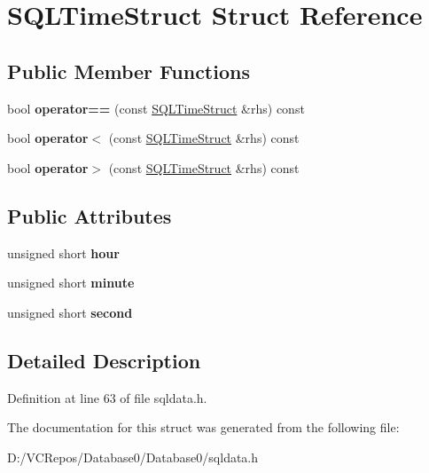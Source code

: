 \hypertarget{struct_s_q_l_time_struct}{}\section{S\+Q\+L\+Time\+Struct Struct Reference}
\label{struct_s_q_l_time_struct}
\subsection*{Public Member Functions}
\begin{DoxyCompactItemize}
\item 
\mbox{\label{struct_s_q_l_time_struct_a12aabdc212ea4f5573facea81e282219}} 
bool {\bfseries operator==} (const \mbox{\hyperlink{struct_s_q_l_time_struct}{S\+Q\+L\+Time\+Struct}} \&rhs) const
\item 
\mbox{\label{struct_s_q_l_time_struct_a1d17c7e9fffb661c4768f94443f683d2}} 
bool {\bfseries operator$<$} (const \mbox{\hyperlink{struct_s_q_l_time_struct}{S\+Q\+L\+Time\+Struct}} \&rhs) const
\item 
\mbox{\label{struct_s_q_l_time_struct_a79e7d592043ee37a124194979898b3cf}} 
bool {\bfseries operator$>$} (const \mbox{\hyperlink{struct_s_q_l_time_struct}{S\+Q\+L\+Time\+Struct}} \&rhs) const
\end{DoxyCompactItemize}
\subsection*{Public Attributes}
\begin{DoxyCompactItemize}
\item 
\mbox{\label{struct_s_q_l_time_struct_ac4d14e2c8f953ff8dfbc43fbaafe42aa}} 
unsigned short {\bfseries hour}
\item 
\mbox{\label{struct_s_q_l_time_struct_a595f8a35baa9acc5d07b618c3dff5755}} 
unsigned short {\bfseries minute}
\item 
\mbox{\label{struct_s_q_l_time_struct_a55b1c92cf71f9039756923581a74667a}} 
unsigned short {\bfseries second}
\end{DoxyCompactItemize}


\subsection{Detailed Description}


Definition at line 63 of file sqldata.\+h.



The documentation for this struct was generated from the following file\+:\begin{DoxyCompactItemize}
\item 
D\+:/\+V\+C\+Repos/\+Database0/\+Database0/sqldata.\+h\end{DoxyCompactItemize}
